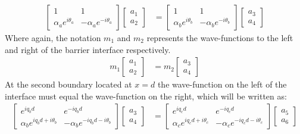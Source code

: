 		\begin{align}
			\left[\begin{array}{ccc}
				1&1\\
				\alpha_{a}e^{i\theta_{a}}&-\alpha_{a}e^{-i\theta_{a}}
			\end{array}\right]
			\left[\begin{array}{ccc}
				a_{1}\\
				a_{2}
			\end{array}\right]
			&=
			\left[\begin{array}{ccc}
				1&1\\
				\alpha_{b}e^{i\theta_{b}}&-\alpha_{b}e^{-i\theta_{b}}
			\end{array}\right]
			\left[\begin{array}{ccc}
				a_{3}\\
				a_{4}
			\end{array}\right]
		\end{align}
		Where again, the notation $m_{1}$ and $m_{2}$ represents the wave-functions to the left and right of the barrier interface respectively.
		\begin{align}
			m_{1}\left[\begin{array}{ccc}
				a_{1}\\
				a_{2}
			\end{array}\right]
			&=
			m_{2}\left[\begin{array}{ccc}
				a_{3}\\
				a_{4}
			\end{array}\right]
		\end{align}
		At the second boundary located at $x=d$ the wave-function on the left of the interface must equal the wave-function on the right, which will be written as:
		\begin{align}
			\left[\begin{array}{ccc}
				e^{iq_{b}d}&e^{-iq_{b}d}\\
				\alpha_{b}e^{iq_{b}d+i\theta_{b}}&-\alpha_{b}e^{-iq_{b}d-i\theta_{b}}
			\end{array}\right]
			\left[\begin{array}{ccc}
				a_{3}\\
				a_{4}
			\end{array}\right]
			&=
			\left[\begin{array}{ccc}
				e^{iq_{c}d}&e^{-iq_{c}d}\\
				\alpha_{c}e^{iq_{c}d+i\theta_{c}}&-\alpha_{c}e^{-iq_{c}d-i\theta_{c}}
			\end{array}\right]
			\left[\begin{array}{ccc}
				a_{5}\\
				a_{6}
			\end{array}\right]
		\end{align}
